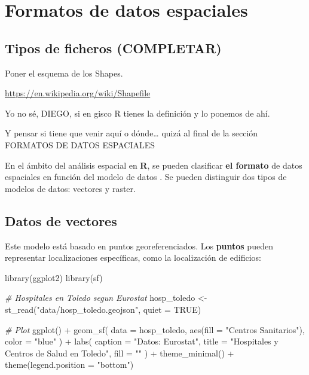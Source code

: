 \documentclass[
]{report}
\newenvironment{Shaded}{\begin{snugshade}}{\end{snugshade}}
\newcommand{\AttributeTok}[1]{\textcolor[rgb]{0.77,0.63,0.00}{#1}}
\newcommand{\CommentTok}[1]{\textcolor[rgb]{0.56,0.35,0.01}{\textit{#1}}}
\newcommand{\ConstantTok}[1]{\textcolor[rgb]{0.00,0.00,0.00}{#1}}
\newcommand{\FunctionTok}[1]{\textcolor[rgb]{0.00,0.00,0.00}{#1}}
\newcommand{\NormalTok}[1]{#1}
\newcommand{\OtherTok}[1]{\textcolor[rgb]{0.56,0.35,0.01}{#1}}
\newcommand{\SpecialCharTok}[1]{\textcolor[rgb]{0.00,0.00,0.00}{#1}}
\newcommand{\StringTok}[1]{\textcolor[rgb]{0.31,0.60,0.02}{#1}}
\begin{document}
\hypertarget{formatos}{%
\chapter{Formatos de datos espaciales}\label{formatos}}

\hypertarget{tipos-de-ficheros-completar}{%
\section{Tipos de ficheros (COMPLETAR)}\label{tipos-de-ficheros-completar}}

Poner el esquema de los Shapes.

\url{https://en.wikipedia.org/wiki/Shapefile}

Yo no sé, DIEGO, si en gisco R tienes la definición y lo ponemos de ahí.

Y pensar si tiene que venir aquí o dónde\ldots{} quizá al final de la sección
FORMATOS DE DATOS ESPACIALES

En el ámbito del análisis espacial en \textbf{R}, se pueden clasificar \textbf{el formato}
de datos espaciales en función del modelo de datos \citep{Lovelance_et_al_2019}. Se
pueden distinguir dos tipos de modelos de datos: vectores y raster.

\hypertarget{datos-de-vectores}{%
\section{Datos de vectores}\label{datos-de-vectores}}

Este modelo está basado en puntos georeferenciados. Los \textbf{puntos} pueden
representar localizaciones específicas, como la localización de edificios:

\begin{Shaded}
\begin{Highlighting}[]

\FunctionTok{library}\NormalTok{(ggplot2)}
\FunctionTok{library}\NormalTok{(sf)}


\CommentTok{\# Hospitales en Toledo segun Eurostat}
\NormalTok{hosp\_toledo }\OtherTok{\textless{}{-}} \FunctionTok{st\_read}\NormalTok{(}\StringTok{"data/hosp\_toledo.geojson"}\NormalTok{, }\AttributeTok{quiet =} \ConstantTok{TRUE}\NormalTok{)}

\CommentTok{\# Plot}
\FunctionTok{ggplot}\NormalTok{() }\SpecialCharTok{+}
  \FunctionTok{geom\_sf}\NormalTok{(}
    \AttributeTok{data =}\NormalTok{ hosp\_toledo, }\FunctionTok{aes}\NormalTok{(}\AttributeTok{fill =} \StringTok{"Centros Sanitarios"}\NormalTok{),}
    \AttributeTok{color =} \StringTok{"blue"}
\NormalTok{  ) }\SpecialCharTok{+}
  \FunctionTok{labs}\NormalTok{(}
    \AttributeTok{caption =} \StringTok{"Datos: Eurostat"}\NormalTok{,}
    \AttributeTok{title =} \StringTok{"Hospitales y Centros de Salud en Toledo"}\NormalTok{,}
    \AttributeTok{fill =} \StringTok{""}
\NormalTok{  ) }\SpecialCharTok{+}
  \FunctionTok{theme\_minimal}\NormalTok{() }\SpecialCharTok{+}
  \FunctionTok{theme}\NormalTok{(}\AttributeTok{legend.position =} \StringTok{"bottom"}\NormalTok{)}
\end{Highlighting}
\end{Shaded}
\end{document}

